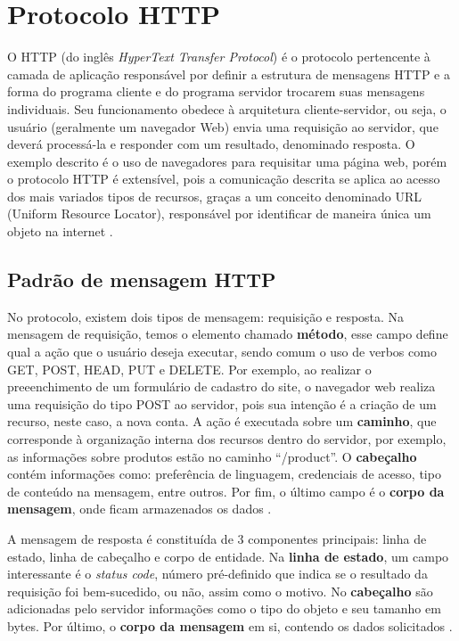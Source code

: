 \section{Protocolo HTTP}

O HTTP (do inglês \textit{HyperText Transfer Protocol}) é o protocolo pertencente à camada de aplicação
responsável por definir a estrutura de mensagens HTTP e a forma do programa cliente e do programa servidor 
trocarem suas mensagens individuais. Seu funcionamento obedece à arquitetura cliente-servidor, ou seja, o
usuário (geralmente um navegador Web) envia uma requisição ao servidor, que deverá processá-la e responder 
com um resultado, denominado resposta. O exemplo descrito é o uso de navegadores para requisitar uma página web, porém 
o protocolo HTTP é extensível, pois a comunicação descrita se aplica ao acesso dos mais variados tipos de recursos, graças a
um conceito denominado URL (Uniform Resource Locator), responsável por identificar de maneira única um objeto na internet \cite[pp. 72]{redes-kurose2010}.

\subsection{Padrão de mensagem HTTP}

No protocolo, existem dois tipos de mensagem: requisição e resposta. Na mensagem de requisição, temos o elemento
chamado \textbf{método}, esse campo define qual a ação que o usuário deseja executar, sendo comum o uso de verbos
como GET, POST, HEAD, PUT e DELETE. Por exemplo, ao realizar o preeenchimento de um formulário de cadastro do site, o
navegador web realiza uma requisição do tipo POST ao servidor, pois sua intenção é a criação de um recurso,
neste caso, a nova conta. A ação é executada sobre um \textbf{caminho}, que corresponde à organização interna dos recursos 
dentro do servidor, por exemplo, as informações sobre produtos estão no caminho ``/product''. O \textbf{cabeçalho} contém informações como: preferência de linguagem,
credenciais de acesso, tipo de conteúdo na mensagem, entre outros. Por fim, o último campo é o \textbf{corpo da mensagem}, 
onde ficam armazenados os dados \cite[pp. 77]{redes-kurose2010}.

A mensagem de resposta é constituída de 3 componentes principais: linha de estado, linha de cabeçalho e corpo de entidade. Na \textbf{linha de estado}, um campo
interessante é o \textit{status code}, número pré-definido que indica se o resultado da requisição foi bem-sucedido, ou não, assim como o motivo. No \textbf{cabeçalho}
são adicionadas pelo servidor informações como o tipo do objeto e seu tamanho em bytes. Por último, o \textbf{corpo da mensagem} em si, contendo os dados solicitados \cite[pp. 78]{redes-kurose2010}.

